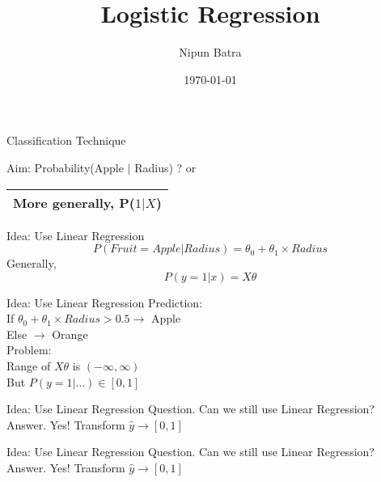 \documentclass{beamer}
\title{Logistic Regression}
\date{\today}
\author{Nipun Batra}
\institute{IIT Gandhinagar}
\begin{document}
	\maketitle
	
	\begin{frame}{Classification Technique}
    
    Aim: Probability(Apple $|$ Radius) ? or
    \begin{tabular}{|c|} \hline
        More generally, P($1 | X$)  \\ \hline
      \end{tabular}
    
	\end{frame}

	\begin{frame}{Idea: Use Linear Regression}
	\begin{equation*}
		P(Fruit = Apple | Radius) = \theta_{0} + \theta_{1} \times Radius
	\end{equation*}
	Generally,
	\begin{equation*}
	    P(y = 1 | x) = X\theta
	\end{equation*}
	\end{frame}
	\begin{frame}{Idea: Use Linear Regression}
	Prediction:\\
	If $\theta_{0} + \theta_{1}\times Radius > 0.5 \rightarrow$ Apple \\
	\hspace{3.3cm} Else $\rightarrow$ Orange\\
	Problem:\\
	Range of $X\theta$ is $(-\infty, \infty)$\\
	But $P(y = 1 | \ldots) \in [0, 1]$
	\end{frame}
	\begin{frame}{Idea: Use Linear Regression}
	Question. Can we still use Linear Regression? \\
	Answer. Yes! Transform $\hat{y} \rightarrow [0, 1]$
	\end{frame}
	\begin{frame}{Idea: Use Linear Regression}
	Question. Can we still use Linear Regression? \\
	Answer. Yes! Transform $\hat{y} \rightarrow [0, 1]$
	\end{frame}
\end{document}
